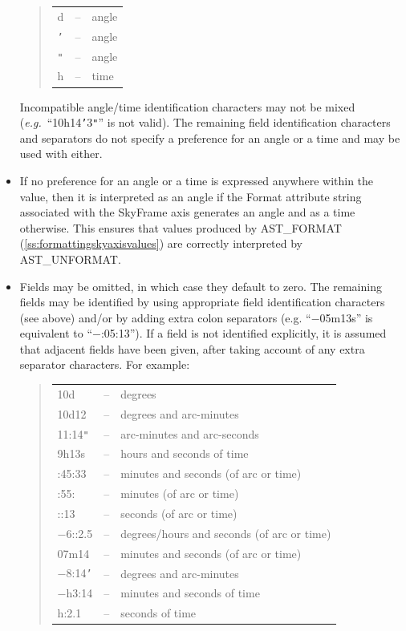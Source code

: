 \documentclass[twoside,11pt]{article}
\newcommand{\secref}[1]{\S\ref{#1}}
\renewcommand{\secref}[1]{\ref{#1}}
\begin{document}
\begin{itemize}
\begin{quote}
\begin{tabular}{lll}
d & -- & angle \\
{\tt{'}} & -- & angle \\
{\tt{"}} & -- & angle \\
h & -- & time
\end{tabular}
\end{quote}

Incompatible angle/time identification characters may not be mixed
({\em{e.g.}}\ ``10h14{\tt{'}}3{\tt{"}}'' is not valid).  The remaining
field identification characters and separators do not specify a
preference for an angle or a time and may be used with either.

\item If no preference for an angle or a time is expressed anywhere
within the value, then it is interpreted as an angle if the Format
attribute string associated with the SkyFrame axis generates an angle
and as a time otherwise.  This ensures that values produced by
AST\_FORMAT (\secref{ss:formattingskyaxisvalues}) are correctly
interpreted by AST\_UNFORMAT.

\item Fields may be omitted, in which case they default to zero. The
remaining fields may be identified by using appropriate field
identification characters (see above) and/or by adding extra colon
separators (e.g. ``$-$05m13s'' is equivalent to ``$-$:05:13''). If a field
is not identified explicitly, it is assumed that adjacent fields have
been given, after taking account of any extra separator
characters. For example:

\begin{quote}
\begin{tabular}{lll}
10d & -- & degrees \\
10d12 & -- & degrees and arc-minutes \\
11:14{\tt{"}} & -- & arc-minutes and arc-seconds \\
9h13s & -- & hours and seconds of time \\
:45:33 & -- & minutes and seconds (of arc or time) \\
:55: & -- & minutes (of arc or time) \\
::13 & -- & seconds (of arc or time) \\
$-$6::2.5 & -- & degrees/hours and seconds (of arc or time) \\
07m14 & -- & minutes and seconds (of arc or time) \\
$-$8:14{\tt{'}} & -- & degrees and arc-minutes \\
$-$h3:14 & -- & minutes and seconds of time \\
h:2.1 & -- & seconds of time
\end{tabular}
\end{quote}


\end{itemize}
\end{document}
